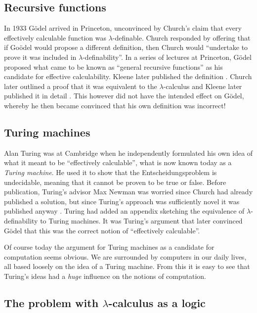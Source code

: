 \subsection{Recursive functions}

In 1933 G\"odel arrived in Princeton, unconvinced by Church's claim that every effectively calculable function was $\lambda$-definable. Church responded by offering that if Go\"odel would propose a different definition, then Church would ``undertake to prove it was included in $\lambda$-definability''. In a series of lectures at Princeton, G\"odel proposed what came to be known as ``general recursive functions'' as his candidate for effective calculability. Kleene later published the definition \cite{kleene1936}. Church later outlined a proof that it was equivalent to the $\lambda$-calculus \cite{church1936} and Kleene later published it in detail \cite{kleene1936b}. This however did not have the intended effect on G\"odel, whereby he then became convinced that his own definition was incorrect!

\subsection{Turing machines}

Alan Turing was at Cambridge when he independently formulated his own idea of what it meant to be ``effectively calculable'', what is now known today as a \emph{Turing machine}. He used it to show that the Entscheidungsproblem is undecidable, meaning that it cannot be proven to be true or false. Before publication, Turing's advisor Max Newman was worried since Church had already published a solution, but since Turing's approach was sufficiently novel it was published anyway \cite{turing1936a}. Turing had added an appendix sketching the equivalence of $\lambda$-definability to Turing machines. It was Turing's argument that later convinced G\"odel that this was the correct notion of ``effectively calculable''.

Of course today the argument for Turing machines as a candidate for computation seems obvious.
We are surrounded by computers in our daily lives, all based loosely on the idea of a Turing machine.
From this it is easy to see that Turing's ideas had a \emph{huge} influence on the notions of computation.

\subsection{The problem with \texorpdfstring{$\lambda$}{}-calculus as a logic}

